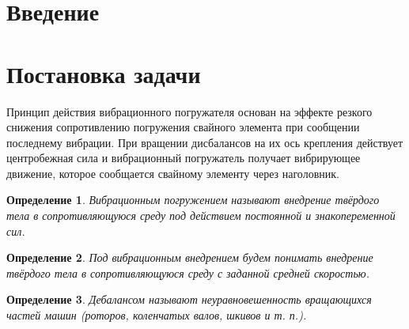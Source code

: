 \documentclass[14pt, a4paper]{extarticle}
\newtheorem{definition}{Определение}
\begin{document}
    \renewcommand\contentsname{Оглавление} %
    \tableofcontents
    \setcounter{page}{2}

    \pagebreak
    \section*{Введение}


    \clearpage
    \section{Постановка задачи}

    Принцип действия вибрационного погружателя основан на эффекте резкого снижения сопротивлению погружения свайного элемента при сообщении последнему вибрации. При вращении дисбалансов на их ось крепления действует центробежная сила и вибрационный погружатель получает вибрирующее движение, которое сообщается свайному элементу через наголовник.

    \begin{definition}
        Вибрационным погружением называют внедрение твёрдого тела в сопротивляющуюся среду под действием постоянной и знакопеременной сил.
    \end{definition}
    
    \begin{definition}
        Под вибрационным внедрением будем понимать внедрение твёрдого тела в сопротивляющуюся среду с заданной средней скоростью.
    \end{definition}

    \begin{definition}
        Дебалансом называют неуравновешенность вращающихся частей машин (роторов, коленчатых валов, шкивов и т. п.).
    \end{definition}
\end{document}
